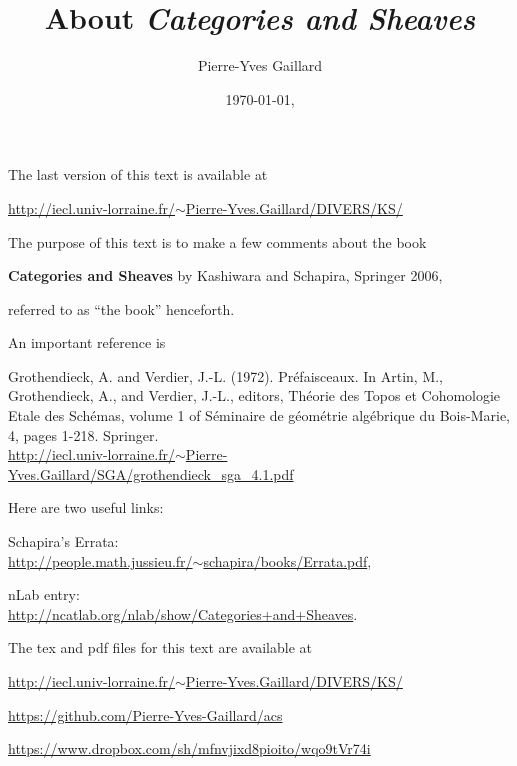 \documentclass[12pt]{article}%
\title{About \em{Categories and Sheaves}}
\author{Pierre-Yves Gaillard}
\date{\today, \currenttime}
\theoremstyle{remark}
\theoremstyle{definition}
\newcommand{\nn}{\noindent}
\begin{document}
\maketitle

\noindent The last version of this text is available at

\noindent\href{http://iecl.univ-lorraine.fr/~Pierre-Yves.Gaillard/DIVERS/KS/}{http://iecl.univ-lorraine.fr/$\sim$Pierre-Yves.Gaillard/DIVERS/KS/}

\tableofcontents\newpage%

\noindent The purpose of this text is to make a few comments about the book%

\textbf{Categories and Sheaves} by Kashiwara and Schapira, Springer 2006,%

\noindent referred to as ``the book'' henceforth.%

An important reference is

\noindent[GV] Grothendieck, A. and Verdier, J.-L. (1972). Pr\'efaisceaux. In Artin, M., Grothendieck, A., and Verdier, J.-L., editors, Th\'eorie des Topos et Cohomologie Etale des Sch\'emas, volume 1 of S\'eminaire de g\'eom\'etrie alg\'ebrique du Bois-Marie, 4, pages 1-218. Springer. \\ 
\noindent\href{http://iecl.univ-lorraine.fr/~Pierre-Yves.Gaillard/SGA/grothendieck_sga_4.1.pdf}{\small http://iecl.univ-lorraine.fr/$\sim$Pierre-Yves.Gaillard/SGA/grothendieck\_sga\_4.1.pdf} 

Here are two useful links:

\noindent Schapira's Errata:\\ \href{http://people.math.jussieu.fr/~schapira/books/Errata.pdf}{http://people.math.jussieu.fr/$\sim$schapira/books/Errata.pdf},

\noindent nLab entry:\\ \href{http://ncatlab.org/nlab/show/Categories+and+Sheaves}{http://ncatlab.org/nlab/show/Categories+and+Sheaves}. 

The tex and pdf files for this text are available at
 
\noindent\href{http://iecl.univ-lorraine.fr/~Pierre-Yves.Gaillard/DIVERS/KS/}{http://iecl.univ-lorraine.fr/$\sim$Pierre-Yves.Gaillard/DIVERS/KS/}

\noindent\href{https://github.com/Pierre-Yves-Gaillard/acs}{https://github.com/Pierre-Yves-Gaillard/acs}

\nn\href{https://www.dropbox.com/sh/mfnvjixd8pioito/wqo9tVr74i}{https://www.dropbox.com/sh/mfnvjixd8pioito/wqo9tVr74i}
\end{document}

